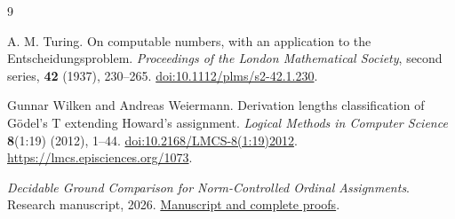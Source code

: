 \begin{thebibliography}{9}

A. M. Turing.
On computable numbers, with an application to the Entscheidungsproblem.
\emph{Proceedings of the London Mathematical Society}, second series,
\textbf{42} (1937), 230--265.
\href{https://doi.org/10.1112/plms/s2-42.1.230}{doi:10.1112/plms/s2-42.1.230}.

Gunnar Wilken and Andreas Weiermann.
Derivation lengths classification of G\"odel's T extending Howard's assignment.
\emph{Logical Methods in Computer Science} \textbf{8}(1:19) (2012), 1--44.
\href{https://doi.org/10.2168/LMCS-8(1:19)2012}{doi:10.2168/LMCS-8(1:19)2012}.
\url{https://lmcs.episciences.org/1073}.

\emph{Decidable Ground Comparison for Norm-Controlled Ordinal Assignments}.
Research manuscript, 2026.
\href{https://github.com/avg-netizen/logic-lineages-papers/blob/papers/ii5-explanatory-2026-11-17/17-permitted-control-canonical-comparison/paper.pdf}{Manuscript and complete proofs}.

\end{thebibliography}

